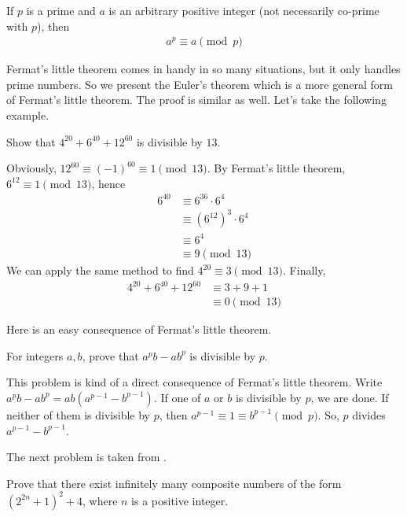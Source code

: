  \begin{corollary}
	 	If $p$ is a prime and $a$ is an arbitrary positive integer (not necessarily co-prime with $p$), then
	 	\begin{align*}
	 	a^p \equiv a \pmod p
	 	\end{align*}
 \end{corollary}
Fermat's little theorem comes in handy in so many situations, but it only handles prime numbers. So we present the Euler's theorem which is a more general form of Fermat's little theorem. The proof is similar as well. Let's take the following example.

	\begin{problem}
		Show that $4^{20} + 6^{40} + 12^{60}$ is divisible by $13$.
	\end{problem}

	\begin{solution}
		Obviously, $12^{60}\equiv (-1)^{60} \equiv 1 \pmod {13}$. By Fermat's little theorem, $6^{12} \equiv 1 \pmod{13}$, hence
			\begin{align*}
				6^{40}
					& \equiv 6^{36} \cdot 6^4\\
					& \equiv \left(6^{12}\right)^3 \cdot 6^4\\
					& \equiv 6^4\\
					& \equiv 9 \pmod{13}
			\end{align*}
		We can apply the same method to find $4^{20} \equiv 3 \pmod{13}$. Finally,
			\begin{align*}
				4^{20} + 6^{40} + 12^{60}
					& \equiv 3+9+1\\
					& \equiv 0 \pmod{13}
			\end{align*}
	\end{solution}
Here \textcite[Page $29$, Example $1.29$]{andreescuandricafeng2007} is an easy consequence of Fermat's little theorem.
	\begin{problem}\label{e2}
		For integers $a,b$, prove that $a^pb-ab^p$ is divisible by $p$.
	\end{problem}

	\begin{solution}
		This problem is kind of a direct consequence of Fermat's little theorem. Write $a^pb-ab^p=ab(a^{p-1}-b^{p-1})$. If one of $a$ or $b$ is divisible by $p$, we are done. If neither of them is divisible by $p$, then $a^{p-1}\equiv1\equiv b^{p-1}\pmod p$. So, $p$ divides $a^{p-1}-b^{p-1}$.
	\end{solution}
The next problem is taken from \textcite[Problem $124$]{WaclawSierpinski1964}.
	\begin{problem}
		Prove that there exist infinitely many composite numbers of the form $(2^{2n}+1 )^2+4$, where $n$ is a positive integer.
	\end{problem}

